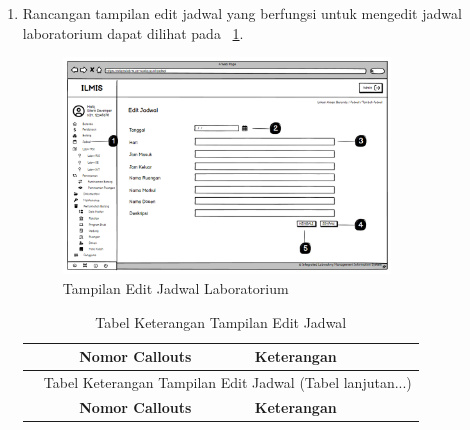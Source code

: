 \begin{enumerate}
	\item Rancangan tampilan edit jadwal yang berfungsi untuk mengedit jadwal laboratorium dapat dilihat pada \pic~\ref{fig:edit-jadwal}.
	      \begin{figure}
		      \centering
		      \includegraphics[width=0.82\textwidth]{konten/gambar/user interface/edit-jadwal.png}
		      \caption{Tampilan Edit Jadwal Laboratorium}
		      \label{fig:edit-jadwal}
	      \end{figure}

	      {
	      \fontsize{11}{13}\selectfont
	      \begin{longtable}{c p{}}
		      \caption{Tabel Keterangan Tampilan Edit Jadwal}
		      \label{tab:edit-jadwal}                                                                                                                                                                 \\
		      \hline
		      \textbf{Nomor Callouts} & \textbf{Keterangan}                                                                                                                                           \\
		      \hline
		      \endfirsthead

		      \multicolumn{2}{c}{\small\tablename\ \thetable\ {Tabel Keterangan Tampilan Edit Jadwal} \space (Tabel lanjutan...)}                                                                     \\
		      \hline
		      \textbf{Nomor Callouts} & \textbf{Keterangan}                                                                                                                                           \\
		      \hline
		      \endhead


\end{longtable}}
\end{enumerate}
